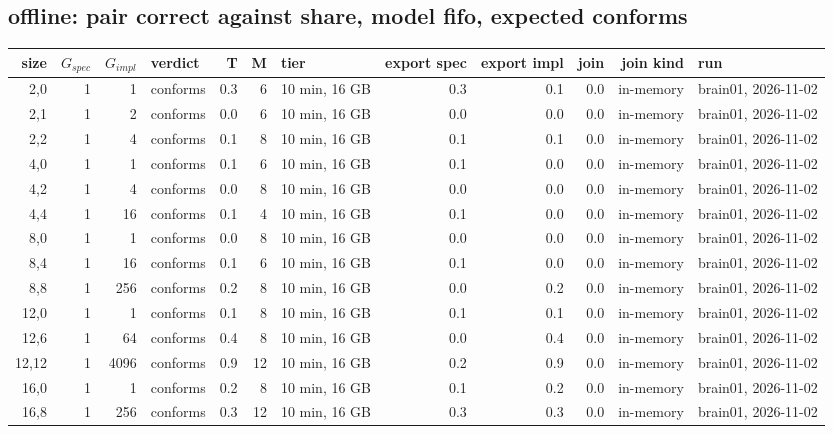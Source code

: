 \documentclass[10pt]{article}
\begin{document}
\subsection*{offline: pair \textsf{correct} against \textsf{share}, model fifo, expected conforms}
\begin{longtable}{@{}rrrlrrlrrrrl@{}}
\toprule
size & $G_{\mathit{spec}}$ & $G_{\mathit{impl}}$ & verdict & T & M & tier & export spec & export impl & join & join kind & run \\
\midrule
\endhead
\color{red} 2,0 & 1 & 1 & conforms & 0.3 & 6 & 10 min, 16 GB & 0.3 & 0.1 & 0.0 & in-memory & brain01, 2026-11-02 \\
\color{red} 2,1 & 1 & 2 & conforms & 0.0 & 6 & 10 min, 16 GB & 0.0 & 0.0 & 0.0 & in-memory & brain01, 2026-11-02 \\
\color{red} 2,2 & 1 & 4 & conforms & 0.1 & 8 & 10 min, 16 GB & 0.1 & 0.1 & 0.0 & in-memory & brain01, 2026-11-02 \\
\color{red} 4,0 & 1 & 1 & conforms & 0.1 & 6 & 10 min, 16 GB & 0.1 & 0.0 & 0.0 & in-memory & brain01, 2026-11-02 \\
\color{red} 4,2 & 1 & 4 & conforms & 0.0 & 8 & 10 min, 16 GB & 0.0 & 0.0 & 0.0 & in-memory & brain01, 2026-11-02 \\
\color{red} 4,4 & 1 & 16 & conforms & 0.1 & 4 & 10 min, 16 GB & 0.1 & 0.0 & 0.0 & in-memory & brain01, 2026-11-02 \\
\color{red} 8,0 & 1 & 1 & conforms & 0.0 & 8 & 10 min, 16 GB & 0.0 & 0.0 & 0.0 & in-memory & brain01, 2026-11-02 \\
\color{red} 8,4 & 1 & 16 & conforms & 0.1 & 6 & 10 min, 16 GB & 0.1 & 0.0 & 0.0 & in-memory & brain01, 2026-11-02 \\
\color{red} 8,8 & 1 & 256 & conforms & 0.2 & 8 & 10 min, 16 GB & 0.0 & 0.2 & 0.0 & in-memory & brain01, 2026-11-02 \\
\color{red} 12,0 & 1 & 1 & conforms & 0.1 & 8 & 10 min, 16 GB & 0.1 & 0.1 & 0.0 & in-memory & brain01, 2026-11-02 \\
\color{red} 12,6 & 1 & 64 & conforms & 0.4 & 8 & 10 min, 16 GB & 0.0 & 0.4 & 0.0 & in-memory & brain01, 2026-11-02 \\
\color{red} 12,12 & 1 & 4096 & conforms & 0.9 & 12 & 10 min, 16 GB & 0.2 & 0.9 & 0.0 & in-memory & brain01, 2026-11-02 \\
\color{red} 16,0 & 1 & 1 & conforms & 0.2 & 8 & 10 min, 16 GB & 0.1 & 0.2 & 0.0 & in-memory & brain01, 2026-11-02 \\
\color{red} 16,8 & 1 & 256 & conforms & 0.3 & 12 & 10 min, 16 GB & 0.3 & 0.3 & 0.0 & in-memory & brain01, 2026-11-02 \\

\end{longtable}
\end{document}
